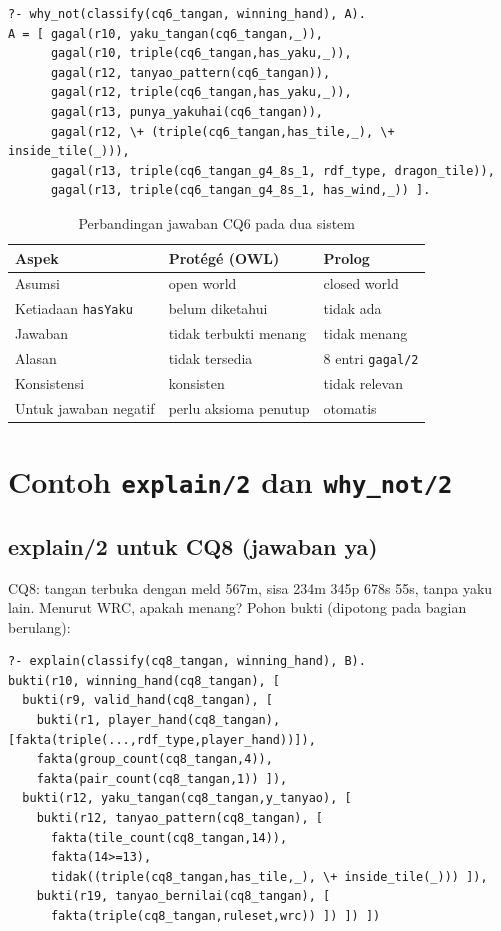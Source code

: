 \documentclass[11pt,a4paper]{article}
\newcommand{\code}[1]{\texttt{#1}}
\begin{document}
\begin{lstlisting}
?- why_not(classify(cq6_tangan, winning_hand), A).
A = [ gagal(r10, yaku_tangan(cq6_tangan,_)),
      gagal(r10, triple(cq6_tangan,has_yaku,_)),
      gagal(r12, tanyao_pattern(cq6_tangan)),
      gagal(r12, triple(cq6_tangan,has_yaku,_)),
      gagal(r13, punya_yakuhai(cq6_tangan)),
      gagal(r12, \+ (triple(cq6_tangan,has_tile,_), \+ inside_tile(_))),
      gagal(r13, triple(cq6_tangan_g4_8s_1, rdf_type, dragon_tile)),
      gagal(r13, triple(cq6_tangan_g4_8s_1, has_wind,_)) ].
\end{lstlisting}

\begin{table}[h]
\centering\small
\caption{Perbandingan jawaban CQ6 pada dua sistem}
\label{tab:ocwa}
\begin{tabular}{@{}p{4.2cm}p{4.6cm}p{5.7cm}@{}}
\toprule
Aspek & Protégé (OWL) & Prolog \\
\midrule
Asumsi & open world & closed world \\
Ketiadaan \code{hasYaku} & belum diketahui & tidak ada \\
Jawaban & tidak terbukti menang & tidak menang \\
Alasan & tidak tersedia & 8 entri \code{gagal/2} \\
Konsistensi & konsisten & tidak relevan \\
Untuk jawaban negatif & perlu aksioma penutup & otomatis \\
\bottomrule
\end{tabular}
\end{table}

\section{Contoh \code{explain/2} dan \code{why_not/2}}

\subsection{explain/2 untuk CQ8 (jawaban ya)}

CQ8: tangan terbuka dengan meld 567m, sisa 234m 345p 678s 55s, tanpa yaku lain. Menurut
WRC, apakah menang? Pohon bukti (dipotong pada bagian berulang):

\begin{lstlisting}
?- explain(classify(cq8_tangan, winning_hand), B).
bukti(r10, winning_hand(cq8_tangan), [
  bukti(r9, valid_hand(cq8_tangan), [
    bukti(r1, player_hand(cq8_tangan), [fakta(triple(...,rdf_type,player_hand))]),
    fakta(group_count(cq8_tangan,4)),
    fakta(pair_count(cq8_tangan,1)) ]),
  bukti(r12, yaku_tangan(cq8_tangan,y_tanyao), [
    bukti(r12, tanyao_pattern(cq8_tangan), [
      fakta(tile_count(cq8_tangan,14)),
      fakta(14>=13),
      tidak((triple(cq8_tangan,has_tile,_), \+ inside_tile(_))) ]),
    bukti(r19, tanyao_bernilai(cq8_tangan), [
      fakta(triple(cq8_tangan,ruleset,wrc)) ]) ]) ])
\end{lstlisting}
\end{document}
